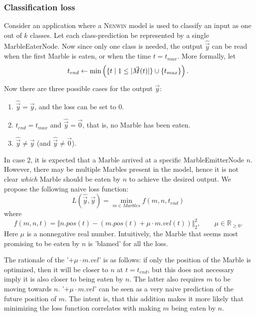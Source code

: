 \subsubsection{Classification loss}
Consider an application where a \textsc{Nenwin} model is used to classify an input as one out of $k$ classes. Let each class-prediction be represented by a single MarbleEaterNode. Now since only one class is needed, the output $\hat{\vec{y}}$ can be read when the first Marble is eaten, or when the time $t = t_{max}$. More formally, let 
\begin{equation}
    t_{end} \leftarrow \min \left(\{t \; | \; 1 \leq \lvert \vec{M}(t) \rvert\}\cup \{t_{max}\}\right).
\end{equation}
Now there are three possible cases for the output $\hat{\vec{y}}$:
\begin{enumerate}
    \item $\hat{\vec{y}} = \vec{y}$, and the loss can be set to 0.
    \item $t_{end} = t_{max}$ and $\hat{\vec{y}} = \vec{0}$, that is, no Marble has been eaten.
    \item $\hat{\vec{y}} \neq \vec{y}$ (and $\hat{\vec{y}} \neq \vec{0}$).
\end{enumerate}

In case 2, it is expected that a Marble arrived at a specific MarbleEmitterNode $n$. However, there may be multiple Marbles present in the model, hence it is not clear \textit{which} Marble should be eaten by $n$ to achieve the desired output. We propose the following naive loss function:
\begin{equation}
    L(\hat{\vec{y}}, \vec{y}) = \min_{m \in Marbles} f(m, n, t_{end}) \label{eq:classification_loss_net}
\end{equation}
where
\begin{equation}
    f(m, n, t) = \big\Vert{n.pos(t) - (m.pos(t) + \mu \cdot m.vel(t))}\big\Vert_2^2, \qquad \mu \in \mathbb{R}_{\geq 0}. \label{eq:classification_loss_one_marble}
\end{equation}
Here $\mu$ is a nonnegative real number. Intuitively, the Marble that seems most promising to be eaten by $n$ is 'blamed' for all the loss.

The rationale of the '$+ \mu \cdot m.vel$' is as follows: if only the position of the Marble is optimized, then it will be closer to $n$ at $t = t_{end}$, but this does not necessary imply it is also closer to being eaten by $n$. The latter also requires $m$ to be moving towards $n$. '$+ \mu \cdot m.vel$' can be seen as a very naive prediction of the future position of $m$. The intent is, that this addition makes it more likely that minimizing the loss function correlates with making $m$ being eaten by $n$.

